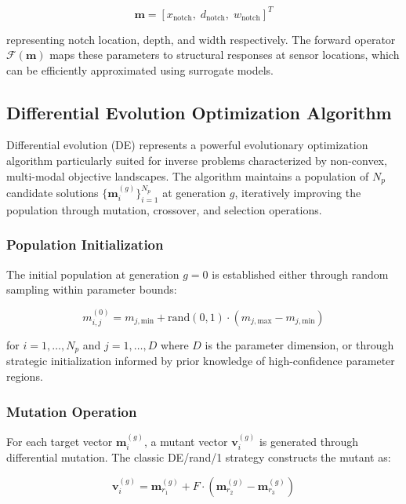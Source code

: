 \documentclass[12pt,a4paper]{report}
\begin{document}
\begin{equation}
\mathbf{m} = [x_{\text{notch}}, \; d_{\text{notch}}, \; w_{\text{notch}}]^T
\end{equation}

representing notch location, depth, and width respectively. The forward operator $\mathcal{F}(\mathbf{m})$ maps these parameters to structural responses at sensor locations, which can be efficiently approximated using surrogate models.

\subsection{Differential Evolution Optimization Algorithm}

Differential evolution (DE) represents a powerful evolutionary optimization algorithm particularly suited for inverse problems characterized by non-convex, multi-modal objective landscapes. The algorithm maintains a population of $N_p$ candidate solutions $\{\mathbf{m}_i^{(g)}\}_{i=1}^{N_p}$ at generation $g$, iteratively improving the population through mutation, crossover, and selection operations.

\subsubsection{Population Initialization}

The initial population at generation $g=0$ is established either through random sampling within parameter bounds:

\begin{equation}
m_{i,j}^{(0)} = m_{j,\text{min}} + \text{rand}(0,1) \cdot (m_{j,\text{max}} - m_{j,\text{min}})
\end{equation}

for $i = 1,\ldots,N_p$ and $j = 1,\ldots,D$ where $D$ is the parameter dimension, or through strategic initialization informed by prior knowledge of high-confidence parameter regions.

\subsubsection{Mutation Operation}

For each target vector $\mathbf{m}_i^{(g)}$, a mutant vector $\mathbf{v}_i^{(g)}$ is generated through differential mutation. The classic DE/rand/1 strategy constructs the mutant as:

\begin{equation}
\mathbf{v}_i^{(g)} = \mathbf{m}_{r_1}^{(g)} + F \cdot (\mathbf{m}_{r_2}^{(g)} - \mathbf{m}_{r_3}^{(g)})
\end{equation}
\end{document}
